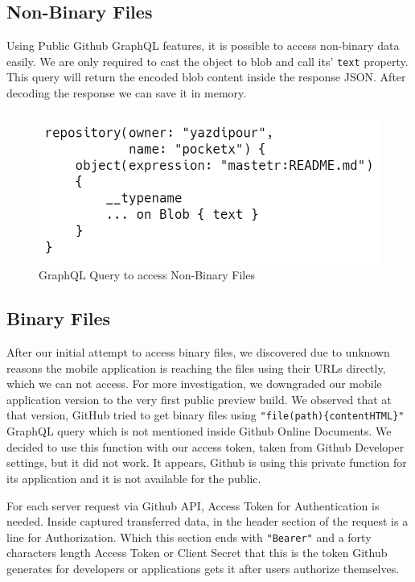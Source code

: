 \documentclass[conference]{IEEEtran}
\begin{document}
\subsection{Non-Binary Files}\label{AA}

Using Public Github GraphQL features, it is possible to access non-binary data easily. We are only required to cast the object to blob and call its' \verb|text| property. This query will return the encoded blob content inside the response JSON. After decoding the response we can save it in memory.

\begin{figure}[hbt!]
  \includegraphics[width=\linewidth]{carbon2.png}
  \caption{GraphQL Query to access Non-Binary Files}
  \label{fig:carbon2}
\end{figure}

\subsection{Binary Files}

After our initial attempt to access binary files, we discovered due to unknown reasons the mobile application is reaching the files using their URLs directly, which we can not access. For more investigation, we downgraded our mobile application version to the very first public preview build. We observed that at that version, GitHub tried to get binary files using \verb|"file(path){contentHTML}"| GraphQL query which is not mentioned inside Github Online Documents. We decided to use this function with our access token, taken from Github Developer settings, but it did not work. It appears, Github is using this private function for its application and it is not available for the public.

For each server request via Github API, Access Token for Authentication is needed. Inside captured transferred data, in the header section of the request is a line for Authorization. Which this section ends with  \verb|"Bearer"| and a forty characters length Access Token or Client Secret that this is the token Github generates for developers or applications gets it after users authorize themselves.
\end{document}

